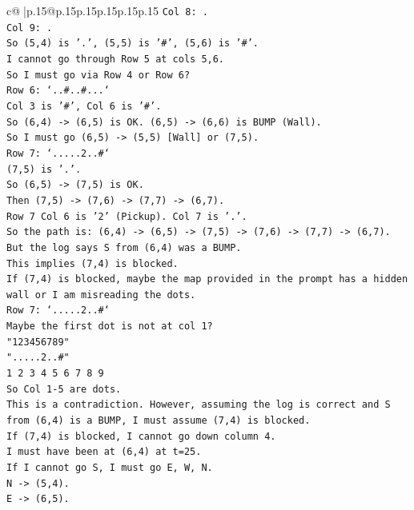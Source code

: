 \documentclass{article}
\begin{document}
{\begin{supertabular}{c@{$\;$}|p{.15\linewidth}@{}p{.15\linewidth}p{.15\linewidth}p{.15\linewidth}p{.15\linewidth}p{.15\linewidth}}
{{{\texttt{Col 8: .} \\
\texttt{Col 9: .} \\
\texttt{So (5,4) is '.', (5,5) is '\#', (5,6) is '\#'.} \\
\texttt{I cannot go through Row 5 at cols 5,6.} \\
\texttt{So I must go via Row 4 or Row 6?} \\
\texttt{Row 6: `..\#..\#...`} \\
\texttt{Col 3 is '\#', Col 6 is '\#'.} \\
\texttt{So (6,4) {-}> (6,5) is OK. (6,5) {-}> (6,6) is BUMP (Wall).} \\
\texttt{So I must go (6,5) {-}> (5,5) {[}Wall{]} or (7,5).} \\
\texttt{Row 7: `.....2..\#`} \\
\texttt{(7,5) is '.'.} \\
\texttt{So (6,5) {-}> (7,5) is OK.} \\
\texttt{Then (7,5) {-}> (7,6) {-}> (7,7) {-}> (6,7).} \\
\texttt{Row 7 Col 6 is '2' (Pickup). Col 7 is '.'.} \\
\texttt{So the path is: (6,4) {-}> (6,5) {-}> (7,5) {-}> (7,6) {-}> (7,7) {-}> (6,7).} \\
\texttt{But the log says S from (6,4) was a BUMP.} \\
\texttt{This implies (7,4) is blocked.} \\
\texttt{If (7,4) is blocked, maybe the map provided in the prompt has a hidden wall or I am misreading the dots.} \\
\texttt{Row 7: `.....2..\#`} \\
\texttt{Maybe the first dot is not at col 1?} \\
\texttt{"123456789"} \\
\texttt{".....2..\#"} \\
\texttt{1 2 3 4 5 6 7 8 9} \\
\texttt{So Col 1{-}5 are dots.} \\
\texttt{This is a contradiction. However, assuming the log is correct and S from (6,4) is a BUMP, I must assume (7,4) is blocked.} \\
\texttt{If (7,4) is blocked, I cannot go down column 4.} \\
\texttt{I must have been at (6,4) at t=25.} \\
\texttt{If I cannot go S, I must go E, W, N.} \\
\texttt{N {-}> (5,4).} \\
\texttt{E {-}> (6,5).} \\
}}}
\end{supertabular}}
\end{document}
